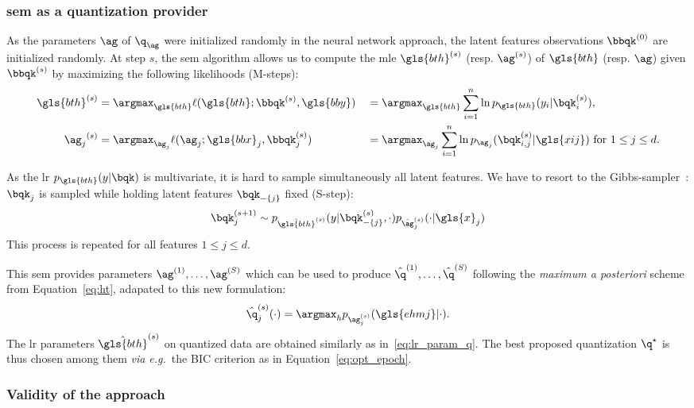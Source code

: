 \subsubsection{\gls{sem} as a quantization provider}

As the parameters $\ag$ of $\q_{\ag}$ were initialized randomly in the neural network approach, the latent features observations $\bbqk^{(0)}$ are initialized randomly. At step $s$, the \gls{sem} algorithm allows us to compute the \gls{mle} ${\gls{bth}}^{(s)}$ (resp. ${\ag}^{(s)}$) of $\gls{bth}$ (resp. $\ag$) given $\bbqk^{(s)}$ by maximizing the following likelihoods (M-steps):
\begin{alignat}{2}
{\gls{bth}}^{(s)} & = \argmax_{\gls{bth}} \ell(\gls{bth}; \bbqk^{(s)}, \gls{bby}) && = \argmax_{\gls{bth}} \sum_{i=1}^n \ln p_{\gls{bth}}(y_i | \bqk^{(s)}_i), \nonumber \\
{\ag_j}^{(s)} & = \argmax_{\ag_j} \ell(\ag_j; \gls{bbx}_j, \bbqk^{(s)}_j) && = \argmax_{\ag_j} \sum_{i=1}^n \ln p_{\ag_j}(\bqk^{(s)}_{i,j} | \gls{xij}) \text{ for } 1 \leq j \leq d. \label{eq:mle_ag}
\end{alignat}

As the \gls{lr} $p_{\gls{bth}}(y | \bqk)$ is multivariate, it is hard to sample simultaneously all latent features. We have to resort to the Gibbs-sampler~\cite{casella1992explaining}: $\bqk_j$ is sampled while holding latent features $\bqk_{-\{j\}}$ fixed (S-step):
\begin{equation} \label{eq:q_draw}
\bqk_j^{(s+1)} \sim p_{\hat{\gls{bth}}^{(s)}}(y | \bqk_{-\{j\}}^{(s)}, \cdot) p_{\hat{\ag}_j^{(s)}}(\cdot | \gls{x}_j)
\end{equation}
This process is repeated for all features $1 \leq j \leq d$.

This \gls{sem} provides parameters ${\ag}^{(1)}, \dots, {\ag}^{(S)}$ which can be used to produce $\hat{\q}^{(1)}, \dots, \hat{\q}^{(S)}$ following the \textit{maximum a posteriori} scheme from Equation~\eqref{eq:ht}, adapated to this new formulation:
\[ \hat{\q}_j^{(s)}(\cdot) = \argmax_{h} p_{\ag_j^{(s)}}(\gls{ehmj} | \cdot ) .\]
The \gls{lr} parameters $\hat{\gls{bth}}^{(s)}$ on quantized data are obtained similarly as in~\eqref{eq:lr_param_q}. The best proposed quantization $\q^\star$ is thus chosen among them \textit{via e.g.}\ the BIC criterion as in Equation~\eqref{eq:opt_epoch}.


\subsubsection{Validity of the approach}

